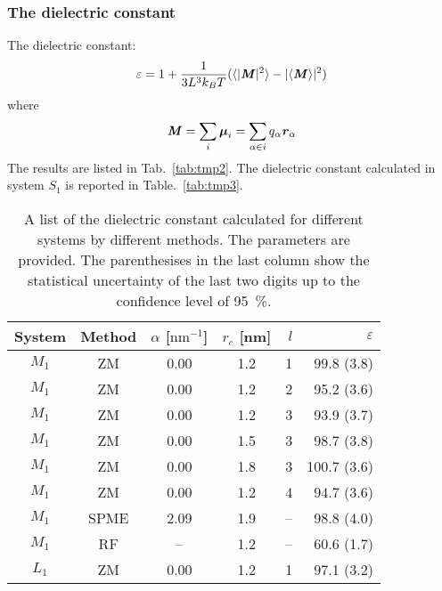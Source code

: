 \documentclass[aip,jcp,a4paper,preprint,unsortedaddress,onecolumn,fleqn]{revtex4-1}
\newcommand{\eps}{\varepsilon}
\newcommand{\vect}[1]{\textbf{\textit{#1}}}
\newcommand{\systemsb}{S_1}
\newcommand{\systemmb}{M_1}
\newcommand{\systemlb}{L_1}
\begin{document}
\subsubsection{The dielectric constant}

The dielectric constant:
\begin{align}
  \eps = 1 + \frac{1}{3L^3 k_BT} ( \langle \vert \vect M\vert^2\rangle - \vert\langle \vect M\rangle\vert^2 )
\end{align}
where
\begin{align}
  \vect M = \sum_i\boldsymbol\mu_i = \sum_{\alpha\in i} q_\alpha\vect r_\alpha
\end{align}
The results are listed in Tab.~\ref{tab:tmp2}. The dielectric constant calculated in system $\systemsb$ is reported in Table.~\ref{tab:tmp3}.

\begin{table}
  \centering
  \caption{A list of the dielectric constant calculated for different systems by different methods.
    The parameters are provided. The parenthesises in the last column show the statistical uncertainty
    of the last two digits up to the confidence level of 95~\%.}
  \begin{tabular*}{0.5\textwidth}{@{\extracolsep{\fill}}cccc rr}\hline\hline
    System & Method      &       $\alpha$ [$\textrm{nm}^{-1}$] & $r_c$ [nm] &    $l$     &       $\eps$ \\\hline
    $\systemmb$  &       ZM          &       0.00    &       1.2     &       1       &       99.8 (3.8)\\ 
    $\systemmb$  &       ZM          &       0.00    &       1.2     &       2       &       95.2 (3.6)\\ 
    $\systemmb$  &       ZM          &       0.00    &       1.2     &       3       &       93.9 (3.7)\\ 
    $\systemmb$  &       ZM          &       0.00    &       1.5     &       3       &       98.7 (3.8)\\ 
    $\systemmb$  &       ZM          &       0.00    &       1.8     &       3       &      100.7 (3.6)\\ 
    $\systemmb$  &       ZM          &       0.00    &       1.2     &       4       &       94.7 (3.6)\\
    $\systemmb$   & SPME          & 2.09  & 1.9   &       --      &       98.8 (4.0) \\
    $\systemmb$  & RF             & --  & 1.2 & -- & 60.6   (1.7) \\
    $\systemlb$  &       ZM          &       0.00    &       1.2     &       1       &       97.1 (3.2)\\ 

\end{tabular*}
\end{table}
\end{document}
